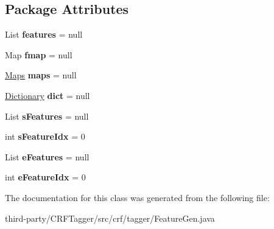 \subsection*{Package Attributes}
\begin{DoxyCompactItemize}
\item 
\hypertarget{classcrf_1_1tagger_1_1FeatureGen_a655214848c9a94e14d5866cb5ab45f24}{
List {\bfseries features} = null}
\label{classcrf_1_1tagger_1_1FeatureGen_a655214848c9a94e14d5866cb5ab45f24}

\item 
\hypertarget{classcrf_1_1tagger_1_1FeatureGen_a1a1b2f6bd2dc8e873818ea8170843dc4}{
Map {\bfseries fmap} = null}
\label{classcrf_1_1tagger_1_1FeatureGen_a1a1b2f6bd2dc8e873818ea8170843dc4}

\item 
\hypertarget{classcrf_1_1tagger_1_1FeatureGen_afc98da0afdc7114ef476c21c4a736e11}{
\hyperlink{classcrf_1_1tagger_1_1Maps}{Maps} {\bfseries maps} = null}
\label{classcrf_1_1tagger_1_1FeatureGen_afc98da0afdc7114ef476c21c4a736e11}

\item 
\hypertarget{classcrf_1_1tagger_1_1FeatureGen_a108e9782815efc7fb9dc8fec970411d7}{
\hyperlink{classcrf_1_1tagger_1_1Dictionary}{Dictionary} {\bfseries dict} = null}
\label{classcrf_1_1tagger_1_1FeatureGen_a108e9782815efc7fb9dc8fec970411d7}

\item 
\hypertarget{classcrf_1_1tagger_1_1FeatureGen_a65fcab516e3b5718f4e45c47ff5a8c72}{
List {\bfseries sFeatures} = null}
\label{classcrf_1_1tagger_1_1FeatureGen_a65fcab516e3b5718f4e45c47ff5a8c72}

\item 
\hypertarget{classcrf_1_1tagger_1_1FeatureGen_a9dcfba9e0e9e1b0a3bf60aa86b08ca8e}{
int {\bfseries sFeatureIdx} = 0}
\label{classcrf_1_1tagger_1_1FeatureGen_a9dcfba9e0e9e1b0a3bf60aa86b08ca8e}

\item 
\hypertarget{classcrf_1_1tagger_1_1FeatureGen_aa37c97cde2210fd228f16f56a1521f19}{
List {\bfseries eFeatures} = null}
\label{classcrf_1_1tagger_1_1FeatureGen_aa37c97cde2210fd228f16f56a1521f19}

\item 
\hypertarget{classcrf_1_1tagger_1_1FeatureGen_a1ec33190b09ad68c42b4260fa51047fd}{
int {\bfseries eFeatureIdx} = 0}
\label{classcrf_1_1tagger_1_1FeatureGen_a1ec33190b09ad68c42b4260fa51047fd}

\end{DoxyCompactItemize}


The documentation for this class was generated from the following file:\begin{DoxyCompactItemize}
\item 
third-\/party/CRFTagger/src/crf/tagger/FeatureGen.java\end{DoxyCompactItemize}
